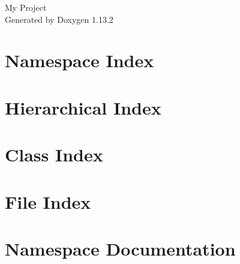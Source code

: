 \documentclass[twoside]{book}
\newcommand{\+}{\discretionary{\mbox{\scriptsize$\hookleftarrow$}}{}{}}
\newcommand{\clearemptydoublepage}{%
    \newpage{\pagestyle{empty}\cleardoublepage}%
  }
\begin{document}
  \raggedbottom
    \hypersetup{pageanchor=false,
                bookmarksnumbered=true,
                pdfencoding=unicode
               }
  \begin{titlepage}
  \vspace*{7cm}
  \begin{center}%
  {\Large My Project}\\
  \vspace*{1cm}
  {\large Generated by Doxygen 1.13.2}\\
  \end{center}
  \end{titlepage}
  \clearemptydoublepage
  \tableofcontents
  \clearemptydoublepage
  \hypersetup{pageanchor=true}
\chapter{Namespace Index}

\chapter{Hierarchical Index}

\chapter{Class Index}

\chapter{File Index}

\chapter{Namespace Documentation}


\end{document}
